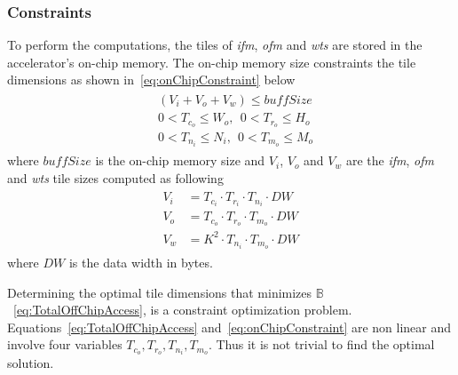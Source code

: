\documentclass[a4paper,10pt]{article}
\newcommand{\numBytesOffChip}{\mathbb{B}}
\newcommand{\dataWidth}{DW}
\newcommand{\BuffSize}{buffSize}
\begin{document}
\subsubsection{Constraints}
To perform the computations, the tiles of \textit{ifm}, \textit{ofm} and \textit{wts} are stored in the accelerator's on-chip memory. The on-chip memory size constraints the tile dimensions as shown in~\eqref{eq:onChipConstraint} below
\begin{align}\label{eq:onChipConstraint}
	\begin{split}
		&(V_{i}{+}V_{o}{+}V_{w})\leq \BuffSize \\
		&0<T_{c_o}\leq W_o,~\ 0<T_{r_o}\leq H_o\\
		&0<T_{n_i}\leq N_i,~\ 0<T_{m_o}\leq M_o
	\end{split}
\end{align}
where $\BuffSize$ is the on-chip memory size and $V_{i}$, $V_{o}$ and $V_{w}$ are the \textit{ifm}, \textit{ofm} and \textit{wts} tile sizes computed as following 
\begin{align}\label{eq:tilesVol}
	\begin{split}
		V_{i}&=T_{c_i}{\cdot} T_{r_i}{\cdot} T_{n_i}{\cdot}\dataWidth\\
		V_{o}&=T_{c_o}{\cdot} T_{r_o}{\cdot} T_{m_o}{\cdot}\dataWidth\\
		V_{w}&=K^2{\cdot} T_{n_i}{\cdot} T_{m_o}{\cdot}\dataWidth
	\end{split}
\end{align}
where $\dataWidth$ is the data width in bytes. 

Determining the optimal tile dimensions that minimizes $\numBytesOffChip$~\eqref{eq:TotalOffChipAccess}, is a constraint optimization problem. Equations~\eqref{eq:TotalOffChipAccess} and~\eqref{eq:onChipConstraint} are non linear and involve four variables $T_{c_o},T_{r_o},T_{n_i},T_{m_o}$. Thus it is not trivial to find the optimal solution.
\end{document}
